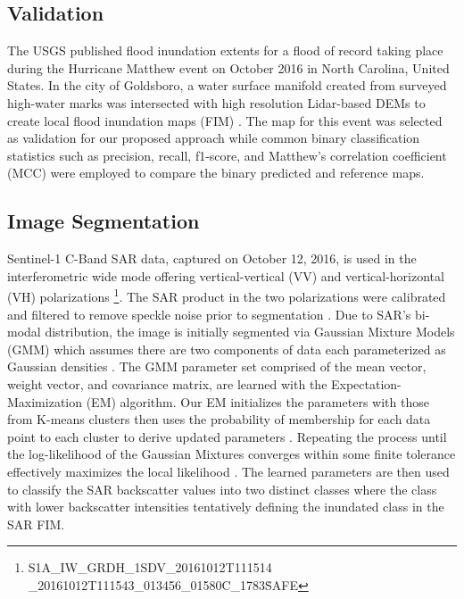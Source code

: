\documentclass{article}
\begin{document}
\subsection{Validation}
\label{ssec:validation}

The USGS published flood inundation extents for a flood of record taking place during the Hurricane Matthew event on October 2016 in North Carolina, United States. 
In the city of Goldsboro, a water surface manifold created from surveyed high-water marks was intersected with high resolution Lidar-based DEMs to create local flood inundation maps (FIM) \cite{musser2017characterization}.
The map for this event was selected as validation for our proposed approach while common binary classification statistics such as precision, recall, f1-score, and Matthew's correlation coefficient (MCC) \cite{canbek2017binary,chicco2020advantages,matthews1975comparison,baldi2000assessing} were employed to compare the binary predicted and reference maps.

\subsection{Image Segmentation}
\label{ssec:image_segmentation}

Sentinel-1 C-Band SAR data, captured on October 12, 2016, is used in the interferometric wide mode offering vertical-vertical (VV) and vertical-horizontal (VH) polarizations \cite{copernicus2016sentinel} \footnote{S1A\_IW\_GRDH\_1SDV\_20161012T111514 \_20161012T111543\_013456\_01580C\_1783\.SAFE}. 
The SAR product in the two polarizations were calibrated and filtered to remove speckle noise prior to segmentation \cite{zuhlke2015snap,yommy2015sar}. 
Due to SAR's bi-modal distribution, the image is initially segmented via Gaussian Mixture Models (GMM) which assumes there are two components of data each parameterized as Gaussian densities \cite{reynolds2009gaussian,mclachlan2004finite}.
The GMM parameter set comprised of the mean vector, weight vector, and covariance matrix, are learned with the Expectation-Maximization (EM) algorithm. 
Our EM initializes the parameters with those from K-means clusters then uses the probability of membership for each data point to each cluster to derive updated parameters \cite{barazandeh2018behavior,dempster1977maximum}. 
Repeating the process until the log-likelihood of the Gaussian Mixtures converges within some finite tolerance effectively maximizes the local likelihood \cite{barazandeh2018behavior,dempster1977maximum}.
The learned parameters are then used to classify the SAR backscatter values into two distinct classes where the class with lower backscatter intensities tentatively defining the inundated class in the SAR FIM.
\end{document}
